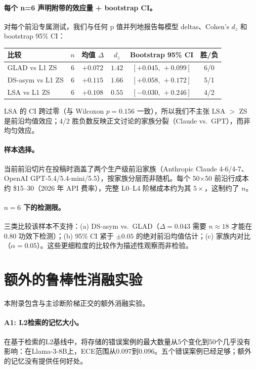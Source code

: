 \documentclass[11pt,a4paper,fontset=fandol]{ctexart}
\begin{document}
\paragraph{每个 n=6 声明附带的效应量 + bootstrap CI。} 对每个前沿专属测试，我们与任何 p 值并列地报告每模型 deltas、Cohen's $d_z$ 和 bootstrap 95\% CI：
\begin{center}
\small
\begin{tabular}{l c c c c c}
\toprule
比较 & $n$ & 均值 $\Delta$ & $d_z$ & Bootstrap 95\% CI & 胜/负 \\
\midrule
GLAD vs L1 ZS    & 6 & $+0.072$ & $1.42$ & $[+0.045,\,+0.099]$ & 6/0 \\
DS-asym vs L1 ZS & 6 & $+0.115$ & $1.66$ & $[+0.058,\,+0.172]$ & 5/1 \\
LSA vs L1 ZS     & 6 & $+0.108$ & $0.55$ & $[-0.030,\,+0.246]$ & 4/2 \\
\bottomrule
\end{tabular}
\end{center}
LSA 的 CI 跨过零（与 Wilcoxon $p=0.156$ 一致），所以我们不主张 LSA $>$ ZS 是前沿均值效应；4/2 胜负数反映正文讨论的家族分裂（Claude vs.\ GPT），而非均匀效应。

\paragraph{样本选择。} 当前前沿切片在投稿时涵盖了两个生产级前沿家族（Anthropic Claude 4-6/4-7、OpenAI GPT-5.4/5.4-mini/5.5），按家族分层而非随机。每个 50$\times$50 前沿行成本约 \$15--30（2026 年 API 费率），完整 L0--L4 阶梯成本约为其 $5\times$，这制约了 $n$。

\paragraph{$n=6$ 下的检测限。} 三类比较该样本不支持：(a) DS-asym vs.\ GLAD（$\Delta=0.043$ 需要 $n\approx 18$ 才能在 0.80 功效下检测）；(b) 95\% CI 紧于 $\pm 0.05$ 的绝对前沿均值估计；(c) 家族内对比（$\alpha{=}0.05$）。这些更细粒度的比较作为描述性观察而非检验。

\section{额外的鲁棒性消融实验}
\label{app:friend_or_foe}
\label{app:gpt55_ablation}
\label{app:detail_ablations}

本附录包含与主诊断阶梯正交的额外消融实验。

\paragraph{A1: L2检索的记忆大小。}
在基于检索的L2基线中，将存储的错误案例的最大数量从5个变化到50个几乎没有影响：在Llama-3-8B上，ECE范围从0.097到0.096。五个错误案例已经足够；额外的记忆没有提供任何好处。
\end{document}
